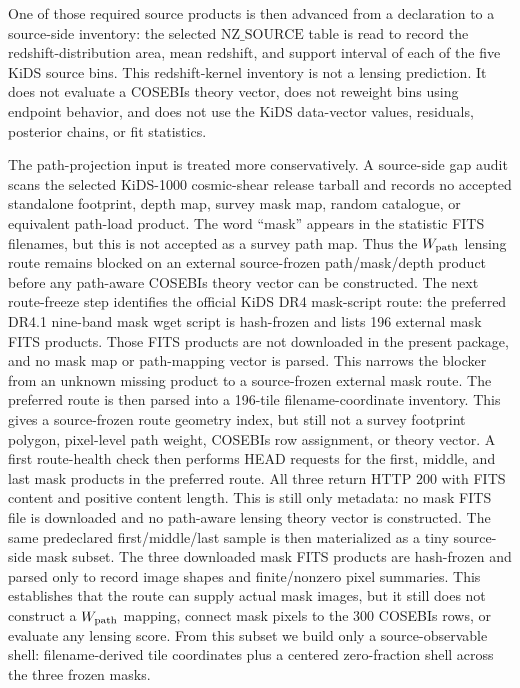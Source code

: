 \documentclass[11pt]{article}
\begin{document}
One of those required source products is then advanced from a declaration to a
source-side inventory: the selected \(\mathrm{NZ\_SOURCE}\) table is read to
record the redshift-distribution area, mean redshift, and support interval of
each of the five KiDS source bins. This redshift-kernel inventory is not a
lensing prediction. It does not evaluate a COSEBIs theory vector, does not
reweight bins using endpoint behavior, and does not use the KiDS data-vector
values, residuals, posterior chains, or fit statistics.

The path-projection input is treated more conservatively. A source-side gap
audit scans the selected KiDS-1000 cosmic-shear release tarball and records no
accepted standalone footprint, depth map, survey mask map, random catalogue, or
equivalent path-load product. The word ``mask'' appears in the statistic FITS
filenames, but this is not accepted as a survey path map. Thus the
\(W_{\rm path}\) lensing route remains blocked on an external source-frozen
path/mask/depth product before any path-aware COSEBIs theory vector can be
constructed.
The next route-freeze step identifies the official KiDS DR4 mask-script route:
the preferred DR4.1 nine-band mask wget script is hash-frozen and lists 196
external mask FITS products. Those FITS products are not downloaded in the
present package, and no mask map or path-mapping vector is parsed. This narrows
the blocker from an unknown missing product to a source-frozen external mask
route.
The preferred route is then parsed into a 196-tile filename-coordinate
inventory. This gives a source-frozen route geometry index, but still not a
survey footprint polygon, pixel-level path weight, COSEBIs row assignment, or
theory vector.
A first route-health check then performs HEAD requests for the first, middle,
and last mask products in the preferred route. All three return HTTP 200 with
FITS content and positive content length. This is still only metadata: no mask
FITS file is downloaded and no path-aware lensing theory vector is constructed.
The same predeclared first/middle/last sample is then materialized as a tiny
source-side mask subset. The three downloaded mask FITS products are hash-frozen
and parsed only to record image shapes and finite/nonzero pixel summaries. This
establishes that the route can supply actual mask images, but it still does not
construct a \(W_{\rm path}\) mapping, connect mask pixels to the 300 COSEBIs
rows, or evaluate any lensing score.
From this subset we build only a source-observable shell: filename-derived tile
coordinates plus a centered zero-fraction shell across the three frozen masks.
\end{document}
